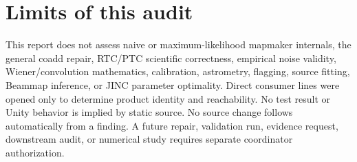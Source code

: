 \documentclass[10pt]{article}
\begin{document}
\section{Limits of this audit}

This report does not assess naive or maximum-likelihood mapmaker internals,
the general coadd repair, RTC/PTC scientific correctness, empirical noise
validity, Wiener/convolution mathematics, calibration, astrometry, flagging,
source fitting, Beammap inference, or JINC parameter optimality.  Direct
consumer lines were opened only to determine product identity and reachability.
No test result or Unity behavior is implied by static source.  No source
change follows automatically from a finding.  A future repair, validation
run, evidence request, downstream audit, or numerical study requires separate
coordinator authorization.
\end{document}
